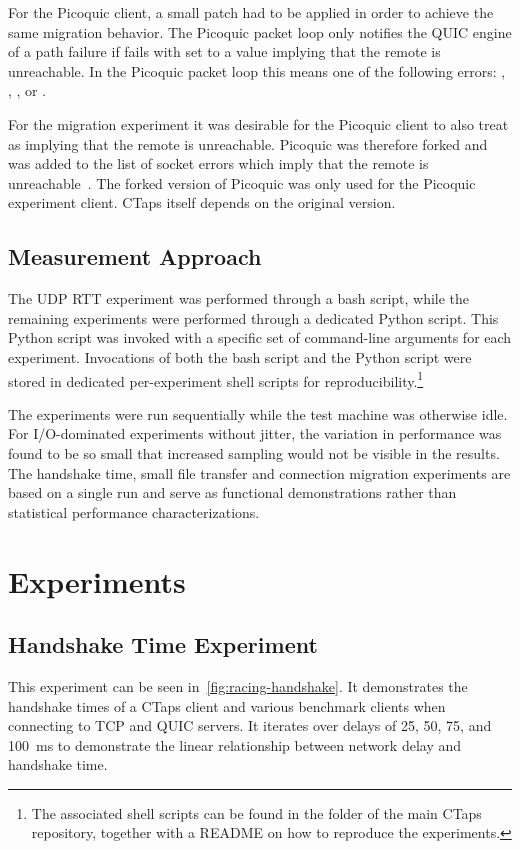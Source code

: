 For the Picoquic client, a small patch had to be applied in order to achieve
the same migration behavior. The Picoquic packet loop only
notifies the QUIC engine of a path failure if  fails with  set to a value implying 
that the remote is unreachable. In the Picoquic packet loop this means one of the following errors: ,
, ,  or 
\cite{PicoquicImpliesUnreachable}.

For the migration experiment it was desirable for the Picoquic client
to also treat  as implying that the remote is unreachable. Picoquic was therefore forked
and  was added to the list of socket errors which imply that
the remote is
unreachable~\cite{PicobrigtImpliesUnreachable}. The forked version of Picoquic was only used
for the Picoquic experiment client. CTaps itself depends on the original version.

\subsection{Measurement Approach}
The UDP RTT experiment was performed through a bash script, while the remaining
experiments were performed through a dedicated Python script.
This Python script was invoked with a specific set of command-line arguments for each
experiment. Invocations of both the bash script and the Python script
were stored in dedicated per-experiment shell
scripts for reproducibility.\footnote{The associated shell scripts
can be found in the  folder of the main CTaps repository,
together with a README on how to reproduce the experiments.}

The experiments were run sequentially while the test
machine was otherwise idle.
For I/O-dominated experiments without jitter, the
variation in performance was found to be so small
that increased sampling would not be visible in the results.
The handshake time, small file transfer and connection
migration experiments are based on a single run
and serve as functional demonstrations rather than statistical performance characterizations.

\section{Experiments}
\subsection{Handshake Time Experiment}\label{sec:single-endpoint-handshake}
This experiment can be seen in~\cref{fig:racing-handshake}.
It demonstrates the handshake times of a CTaps client and various benchmark
clients when connecting to TCP and QUIC servers. It iterates
over delays of 25, 50, 75, and \qty{100}{\milli\second} to demonstrate the linear
relationship between network delay and handshake time.

